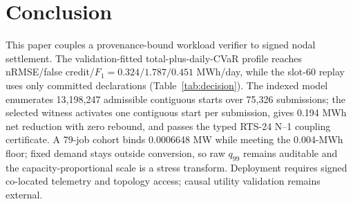 \documentclass[10pt,journal]{IEEEtran}
\begin{document}
\section{Conclusion}\label{sec:conclusion}

This paper couples a provenance-bound workload verifier to signed nodal
settlement. The validation-fitted total-plus-daily-CVaR profile reaches
nRMSE/false credit/$F_1=0.324/1.787/0.451$ MWh/day, while the slot-60 replay
uses only committed declarations (Table~\ref{tab:decision}). The indexed model
enumerates 13,198,247 admissible contiguous starts over 75,326 submissions;
the selected witness activates one contiguous start per submission, gives
0.194 MWh net reduction with zero rebound, and passes the
typed RTS-24 N--1 coupling certificate. A 79-job cohort binds 0.0006648 MW
while meeting the 0.004-MWh floor; fixed demand stays outside conversion, so
raw \(q_{99}\) remains auditable and the capacity-proportional scale is a
stress transform. Deployment requires signed co-located telemetry and topology
access; causal utility validation remains external.

\let\savedthebibliography\thebibliography
\let\savedendthebibliography\endthebibliography
\renewenvironment{thebibliography}[1]{\savedthebibliography{#1}\fontsize{6.5pt}{7.2pt}\selectfont}{\savedendthebibliography}


\end{document}
